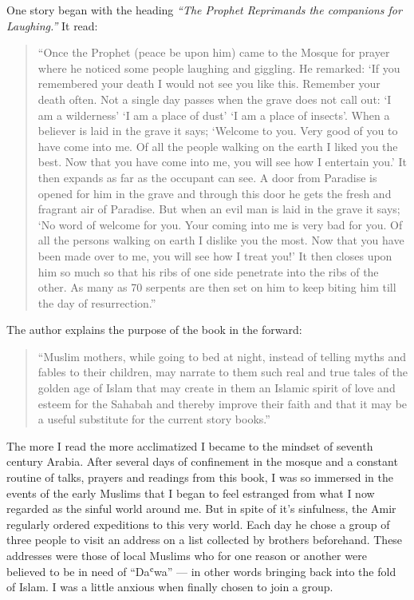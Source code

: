 \documentclass[12pt]{memoir}
\def\`{ʿ} %
\newcommand{\cmt}[2]{#1} %
\begin{document}
One story began with the heading
\emph{“The Prophet Reprimands the \cmt{companions}{_C_ompanions?}
for Laughing.”}
It read:

\begin{quote}
“Once the Prophet (peace be upon him) came to the Mosque for prayer
where he noticed some people laughing and giggling.
He remarked: ‘If you remembered your death I would not see you like this.
Remember your death often.
Not a single day passes when the grave does not call out:
‘I am a wilderness’ ‘I am a place of dust’ ‘I am a place of insects’.
When a believer is laid in the grave it says;
‘Welcome to you.
Very good of you to have come into me.
Of all the people walking on the earth I liked you the best.
Now that you have come into me, you will see how I entertain you.’
It then expands as far as the occupant can see.
A door from Paradise is opened for him in the grave
and through this door he gets the fresh and fragrant air of Paradise.
But when an evil man is laid in the grave it says;
‘No word of welcome for you.
Your coming into me is very bad for you.
Of all the persons walking on earth I dislike you the most.
Now that you have been made over to me, you will see how I treat you!’
It then closes upon him so much so that his ribs
of one side penetrate into the ribs of the other.
As many as 70 serpents are then set on him
to keep biting him till the day of resurrection.”
\end{quote}

The author explains the purpose of the book in the forward:

\begin{quote}
“Muslim mothers, while going to bed at night,
instead of telling myths and fables to their children,
may narrate to them such real and true tales of the golden age of Islam
that may create in them an Islamic spirit of love and esteem for the Sahabah
and thereby improve their faith and that it may be
a useful substitute for the current story books.”
\end{quote}

The more I read the more acclimatized I became
to the mindset of seventh century Arabia.
After several days of confinement in the mosque
and a constant routine of talks, prayers and readings from this book,
I was so immersed in the events of the early Muslims
that I began to feel estranged from what I now regarded
as the sinful world around me.
But in spite of it’s sinfulness,
the Amir regularly ordered expeditions to this very world.
Each day he chose a group of three people to visit an address
on a list collected by brothers beforehand.
These addresses were those of local Muslims
who for one reason or another were believed to be in need of “Da\`wa” —
in other words bringing back into the fold of Islam.
I was a little anxious when finally chosen to join a group.
\end{document}
